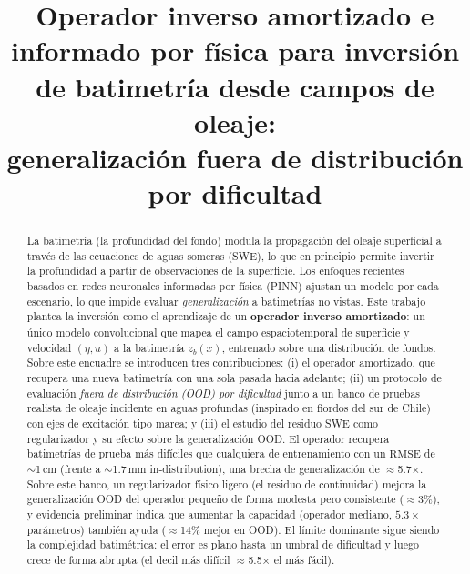 \documentclass[conference]{IEEEtran}
\newcommand{\zb}{z_b}
\newcommand{\RMSE}{\mathrm{RMSE}}
\begin{document}
\title{Operador inverso amortizado e informado por física para
inversión de batimetría desde campos de oleaje:\\
generalización fuera de distribución por dificultad}

\author{
\and
{}
}

\maketitle

\begin{abstract}
La batimetría (la profundidad del fondo) modula la propagación del oleaje
superficial a través de las ecuaciones de aguas someras (SWE), lo que en
principio permite invertir la profundidad a partir de observaciones de la
superficie. Los enfoques recientes basados en redes neuronales informadas por
física (PINN) ajustan un modelo por cada escenario, lo que impide evaluar
\emph{generalización} a batimetrías no vistas. Este trabajo plantea la inversión
como el aprendizaje de un \textbf{operador inverso amortizado}: un único modelo
convolucional que mapea el campo espaciotemporal de superficie y velocidad
$(\eta, u)$ a la batimetría $\zb(x)$, entrenado sobre una distribución de fondos.
Sobre este encuadre se introducen tres contribuciones: (i) el operador
amortizado, que recupera una nueva batimetría con una sola pasada hacia adelante;
(ii) un protocolo de evaluación \emph{fuera de distribución (OOD) por dificultad}
junto a un banco de pruebas realista de oleaje incidente en aguas profundas
(inspirado en fiordos del sur de Chile) con ejes de excitación tipo marea; y
(iii) el estudio del residuo SWE como regularizador y su efecto sobre la
generalización OOD. El operador recupera batimetrías de prueba más difíciles
que cualquiera de entrenamiento con un $\RMSE$ de $\sim$1\,cm (frente a
$\sim$1.7\,mm in-distribution), una brecha de generalización de $\approx$5.7$\times$.
Sobre este banco, un regularizador físico ligero (el residuo de continuidad)
mejora la generalización OOD del operador pequeño de forma modesta pero
consistente ($\approx$3\%), y evidencia preliminar indica que aumentar la
capacidad (operador mediano, $5.3\times$ parámetros) también ayuda ($\approx$14\%
mejor en OOD). El límite dominante sigue siendo la complejidad batimétrica: el
error es plano hasta un umbral de dificultad y luego crece de forma abrupta (el
decil más difícil $\approx$5.5$\times$ el más fácil).
\end{abstract}
\end{document}
